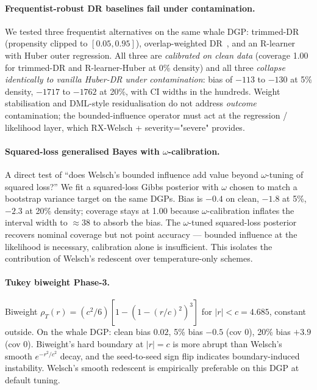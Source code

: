 \paragraph{Frequentist-robust DR baselines fail under contamination.}
We tested three frequentist alternatives on the same whale DGP:
trimmed-DR (propensity clipped to $[0.05, 0.95]$),
overlap-weighted DR~\citep{li2018balancing}, and an R-learner
\citep{nie2021quasi} with Huber outer regression. All three are
\emph{calibrated on clean data} (coverage 1.00 for trimmed-DR and
R-learner-Huber at 0\% density) and all three \emph{collapse
identically to vanilla Huber-DR under contamination}: bias of $-113$
to $-130$ at 5\% density, $-1717$ to $-1762$ at 20\%, with CI widths
in the hundreds. Weight stabilisation and DML-style residualisation
do not address \emph{outcome} contamination; the bounded-influence
operator must act at the regression / likelihood layer, which
RX-Welsch + severity="severe" provides.

\paragraph{Squared-loss generalised Bayes with $\omega$-calibration.}
A direct test of ``does Welsch's bounded influence add value beyond
$\omega$-tuning of squared loss?'' We fit a squared-loss Gibbs
posterior with $\omega$ chosen to match a bootstrap variance target
on the same DGPs. Bias is $-0.4$ on clean, $-1.8$ at 5\%, $-2.3$ at
20\% density; coverage stays at 1.00 because $\omega$-calibration
inflates the interval width to $\approx 38$ to absorb the bias. The
$\omega$-tuned squared-loss posterior recovers nominal coverage but
not point accuracy --- bounded influence at the likelihood is
necessary, calibration alone is insufficient. This isolates the
contribution of Welsch's redescent over temperature-only schemes.

\paragraph{Tukey biweight Phase-3.}
Biweight $\rho_T(r) = (c^2/6)[1 - (1 - (r/c)^2)^3]$ for $|r| < c = 4.685$,
constant outside. On the whale DGP: clean bias $0.02$, 5\% bias
$-0.5$ (cov $0$), 20\% bias $+3.9$ (cov $0$). Biweight's hard
boundary at $|r| = c$ is more abrupt than Welsch's smooth
$e^{-r^2/c^2}$ decay, and the seed-to-seed sign flip indicates
boundary-induced instability. Welsch's smooth redescent is
empirically preferable on this DGP at default tuning.


